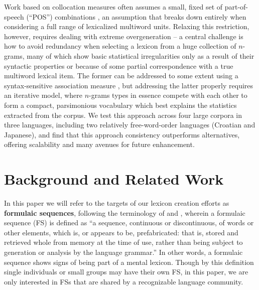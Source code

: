 \documentclass[11pt,letterpaper]{article}
\makeatletter
\def \ie {i.e.,\@ }
\newcommand{\termdef}[1]{\textbf{#1}\xspace}
\makeatother
\begin{document}
Work based on collocation measures often assumes a small, fixed set of part-of-speech (``POS'') combinations \cite{Evert:Krenn:2001,Pecina10}, an assumption that breaks down entirely when considering a full range of lexicalized multiword units. Relaxing this restriction, however, requires dealing with extreme overgeneration -- a central challenge is how to avoid redundancy when selecting a lexicon from a huge collection of $n$-grams, many of which show basic statistical irregularities only as a result of their syntactic properties or because of some partial correspondence with a true multiword lexical item. The former can be addressed to some extent using a syntax-sensitive association measure \cite{Brooke15b}, but addressing the latter properly requires an iterative model, where $n$-grams types in essence compete with each other to form a compact, parsimonious vocabulary which best explains the statistics extracted from the corpus. We test this approach across four large corpora in three languages, including two relatively free-word-order languages (Croatian and Japanese), and find that this approach consistency outperforms alternatives, offering scalability and many avenues for future enhancement.





\section{Background and Related Work}

In this paper we will refer to the targets of our lexicon creation efforts as \termdef{formulaic sequences}, following the terminology of  and , wherein a formulaic sequence (FS) is defined as ``a sequence, continuous or discontinuous, of words or other elements, which is, or appears to be, prefabricated: that is, stored and retrieved whole from memory at the time of use, rather than being subject to generation or analysis by the language grammar.'' In other words, a formulaic sequence shows signs of being part of a mental lexicon. Though by this definition single individuals or small groups may have their own FS, in this paper, we are only interested in FSs that are shared by a recognizable language community. 
\end{document}

